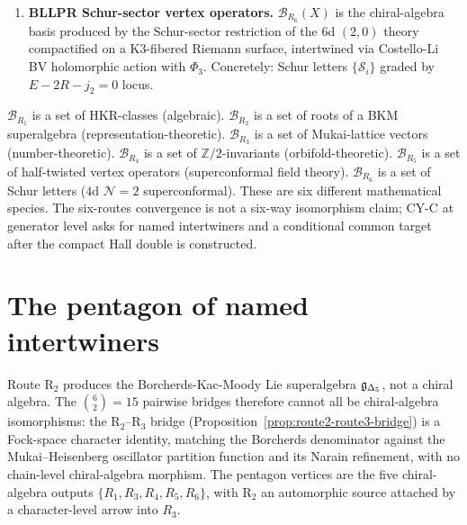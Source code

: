 \begin{definition}
\begin{enumerate}[label=\textbf{R\arabic*.}]
 Concretely: the BPS ring generators of the chiral $R$-current sector, with grading by $U(1)_R$
 charge. Equality with the $\Phi_3$ bar-complex Hilbert series is part of the half-twist comparison datum.
 \item \textbf{BLLPR Schur-sector vertex operators.} $\mathcal{B}_{R_6}(X)$ is the chiral-algebra basis
 produced by the Schur-sector restriction of the $6$d $(2, 0)$ theory compactified on a K3-fibered
 Riemann surface, intertwined via Costello-Li BV holomorphic action with $\Phi_3$. Concretely: Schur
 letters $\{\mathcal{S}_i\}$ graded by $E - 2R - j_2 = 0$ locus.
\end{enumerate}
\end{definition}

\begin{remark}
\label{rem:six-bases-a-priori-disjoint}
$\mathcal{B}_{R_1}$ is a set of HKR-classes (algebraic). $\mathcal{B}_{R_2}$ is a set of roots of a BKM
superalgebra (representation-theoretic). $\mathcal{B}_{R_3}$ is a set of Mukai-lattice vectors (number-theoretic).
$\mathcal{B}_{R_4}$ is a set of $\mathbb{Z}/2$-invariants (orbifold-theoretic). $\mathcal{B}_{R_5}$ is a set
of half-twisted vertex operators (superconformal field theory). $\mathcal{B}_{R_6}$ is a set of Schur
letters ($4$d $\mathcal{N} = 2$ superconformal). These are six different mathematical species. The six-routes
convergence is not a six-way isomorphism claim; CY-C at generator level asks for named intertwiners and a
conditional common target after the compact Hall double is constructed.
\end{remark}

\section{The pentagon of named intertwiners}
\label{sec:cy-c-gl-pentagon}

Route R$_2$ produces the Borcherds-Kac-Moody Lie superalgebra $\mathfrak{g}_{\Delta_5}$, not a chiral algebra. The
$\binom{6}{2} = 15$ pairwise bridges therefore cannot all be chiral-algebra isomorphisms: the
R$_2$--R$_3$ bridge (Proposition~\ref{prop:route2-route3-bridge}) is a Fock-space character identity,
matching the Borcherds denominator against the Mukai--Heisenberg oscillator partition function and its Narain refinement, with no chain-level
chiral-algebra morphism. The pentagon vertices are the five chiral-algebra outputs
$\{R_1, R_3, R_4, R_5, R_6\}$, with R$_2$ an automorphic source attached by a character-level arrow into $R_3$.

